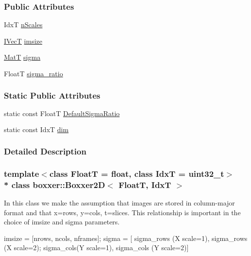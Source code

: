 \subsubsection*{Public Attributes}
\begin{DoxyCompactItemize}
\item 
IdxT \hyperlink{classboxxer_1_1Boxxer2D_a7577d773fec8de75968ef12fe2c1c59b}{n\+Scales}
\item 
\hyperlink{classboxxer_1_1Boxxer2D_acb4dc89c7e1bd2099e7de7b83621ba4f}{I\+VecT} \hyperlink{classboxxer_1_1Boxxer2D_a6f76692e32f0c907d48a72a801a62b9a}{imsize}
\item 
\hyperlink{classboxxer_1_1Boxxer2D_a4af9f3e10a7ceb1c20e1d731263d9aeb}{MatT} \hyperlink{classboxxer_1_1Boxxer2D_a925fe4151cca3a34cba36f1a10b8e382}{sigma}
\item 
FloatT \hyperlink{classboxxer_1_1Boxxer2D_a0fffedee4a39644c5c48fba99e297111}{sigma\+\_\+ratio}
\end{DoxyCompactItemize}
\subsubsection*{Static Public Attributes}
\begin{DoxyCompactItemize}
\item 
static const FloatT \hyperlink{classboxxer_1_1Boxxer2D_a2175ae26a8a47e6bc57a6fb89cc9e177}{Default\+Sigma\+Ratio}
\item 
static const IdxT \hyperlink{classboxxer_1_1Boxxer2D_a66f41631af87252601a33480c0433eea}{dim}
\end{DoxyCompactItemize}


\subsubsection{Detailed Description}
\subsubsection*{template$<$class FloatT = float, class IdxT = uint32\+\_\+t$>$\\*
class boxxer\+::\+Boxxer2\+D$<$ Float\+T, Idx\+T $>$}

In this class we make the assumption that images are stored in column-\/major format and that x=rows, y=cols, t=slices. This relationship is important in the choice of imsize and sigma parameters.

imsize = \mbox{[}nrows, ncols, nframes\mbox{]}; sigma = \mbox{[} sigma\+\_\+rows (X scale=1), sigma\+\_\+rows (X scale=2); sigma\+\_\+cols(Y scale=1), sigma\+\_\+cols (Y scale=2)\mbox{]}


